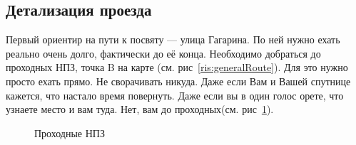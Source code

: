 \documentclass[a4paper, 12pt]{extarticle}
\begin{document}
\subsection*{Детализация проезда}
\par Первый ориентир на пути к посвяту --- улица Гагарина. По ней нужно ехать реально очень долго, фактически до её конца. Необходимо добраться до проходных НПЗ, точка B на карте (см. рис~\ref{ris:generalRoute}). Для это нужно просто ехать прямо. Не сворачивать никуда. Даже если Вам и Вашей спутнице кажется, что настало время повернуть. Даже если вы в один голос орете, что узнаете место и вам туда. Нет, вам до проходных(см. рис~\ref{ris:NPZ}).
\begin{figure}[h!]
	\caption{Проходные НПЗ}
	\label{ris:NPZ}
\end{figure}
\end{document}
